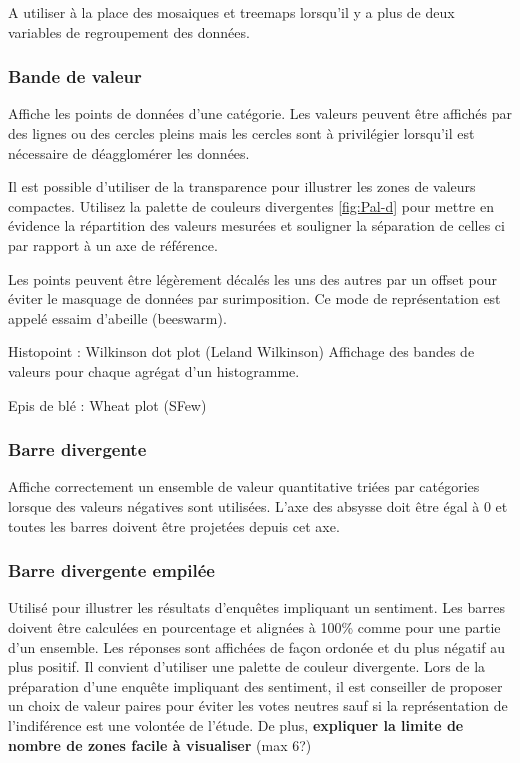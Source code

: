 \documentclass[a4paper,12pt]{article}
\begin{document}
\begin{multicols}{2}
A utiliser à la place des mosaiques et treemaps lorsqu'il y a plus de deux variables de regroupement des données. \autocite{wilkeDirectoryVisualizations2019}
\subsubsection*{Bande de valeur}
\label{sec:org87e94ee}
Affiche les points de données d'une catégorie.\autocite{jonathanschwabishDistribution2021} Les valeurs peuvent être affichés par des lignes ou des cercles pleins mais les cercles sont à privilégier lorsqu'il est nécessaire de déagglomérer les données.

Il est possible d'utiliser de la transparence pour illustrer les zones de valeurs compactes. \autocite{jonathanschwabishDistribution2021} Utilisez la palette de couleurs divergentes \ref{fig:Pal-d} pour mettre en évidence la répartition des valeurs mesurées et souligner la séparation de celles ci par rapport à un axe de référence.\autocite{jonathanschwabishDistribution2021}

Les points peuvent être légèrement décalés les uns des autres par un offset pour éviter le masquage de données par surimposition. Ce mode de représentation est appelé \og essaim d'abeille\fg{} (beeswarm). \autocite{jonathanschwabishDistribution2021}

Histopoint : Wilkinson dot plot (Leland Wilkinson) Affichage des bandes de valeurs pour chaque agrégat d'un histogramme.\autocite{jonathanschwabishDistribution2021}

Epis de blé : Wheat plot (SFew)
\subsubsection*{Barre divergente}
\label{sec:org9a88309}
Affiche correctement un ensemble de valeur quantitative triées par catégories lorsque des valeurs négatives sont utilisées. \autocite{alansmithLexiqueVisuel} L'axe des absysse doit être égal à 0 et toutes les barres doivent être projetées depuis cet axe.
\subsubsection*{Barre divergente empilée}
\label{sec:org9db39d1}
Utilisé pour illustrer les résultats d'enquêtes impliquant un sentiment. \autocite{alansmithLexiqueVisuel} Les barres doivent être calculées en pourcentage et alignées à 100\% comme pour une partie d'un ensemble. Les réponses sont affichées de façon ordonée et du plus négatif au plus positif. Il convient d'utiliser une palette de couleur divergente. Lors de la préparation d'une enquête impliquant des sentiment, il est conseiller de proposer un choix de valeur paires pour éviter les votes neutres sauf si la représentation de l'indiférence est une volontée de l'étude. De plus, \textbf{expliquer la limite de nombre de zones facile à visualiser} (max 6?)

\end{multicols}
\end{document}
